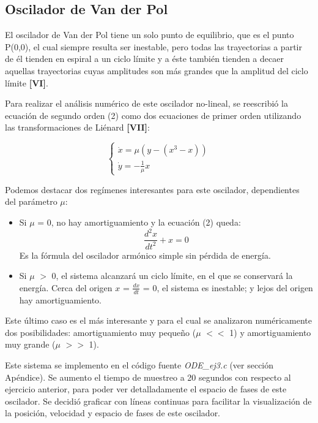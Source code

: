 \documentclass[a4paper,12pt]{article}
\begin{document}
\subsection{Oscilador de Van der Pol}

El oscilador de Van der Pol tiene un solo punto de equilibrio, que es el punto P(0,0), el cual siempre resulta ser inestable, pero todas las trayectorias a partir de \'el tienden en espiral a un ciclo l\'imite y a \'este tambi\'en tienden a decaer aquellas trayectorias cuyas amplitudes son m\'as grandes que la amplitud del ciclo l\'imite \textbf{[VI]}.

Para realizar el an\'alisis num\'erico de este oscilador no-lineal, se reescribi\'o la ecuaci\'on de segundo orden (2) como dos ecuaciones de primer orden utilizando las transformaciones de Li\'enard \textbf{[VII]}:

$$ \begin{cases} \dot{x} = \mu (y-(x^3-x)) \\ \dot{y} = -\frac{1}{\mu}x \end{cases} $$

Podemos destacar dos reg\'imenes interesantes para este oscilador, dependientes del par\'ametro $\mu$:

\begin{itemize}
\item Si $\mu$ = 0, no hay amortiguamiento y la ecuaci\'on (2) queda:
$$ \frac{d^2 x}{dt^2} + x = 0 $$
Es la f\'ormula del oscilador arm\'onico simple sin p\'erdida de energ\'ia.
\item Si $\mu$ $>$ 0, el sistema alcanzar\'a un ciclo l\'imite, en el que se conservar\'a la energ\'ia. Cerca del origen $x$ = $\frac{dx}{dt}$ = 0, el sistema es inestable; y lejos del origen hay amortiguamiento.
\end{itemize}

Este \'ultimo caso es el m\'as interesante y para el cual se analizaron num\'ericamente dos posibilidades: amortiguamiento muy peque\~no ($\mu$ $<<$ 1) y amortiguamiento muy grande ($\mu$ $>>$ 1).

Este sistema se implemento en el c\'odigo fuente \textit{ODE\_ej3.c} (ver secci\'on Ap\'endice). Se aumento el tiempo de muestreo a 20 segundos con respecto al ejercicio anterior, para poder ver detalladamente el espacio de fases de este oscilador.
Se decidi\'o graficar con l\'ineas continuas para facilitar la visualizaci\'on de la posici\'on, velocidad y espacio de fases de este oscilador.
\end{document}
